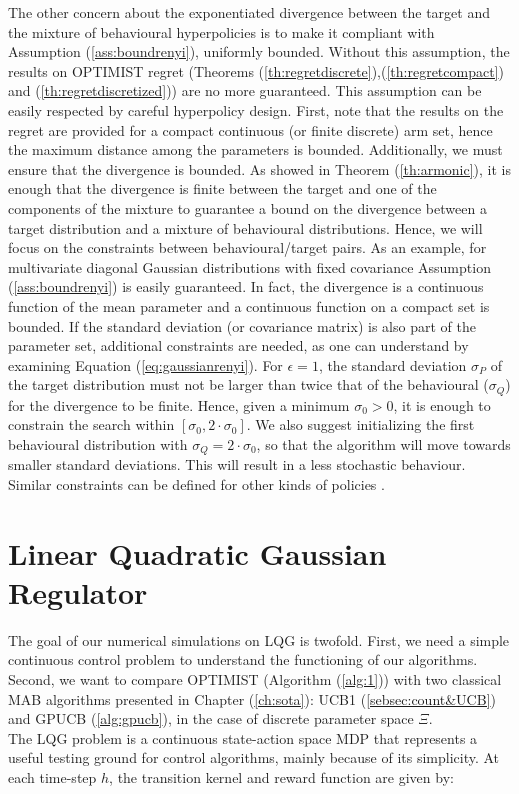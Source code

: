 The other concern about the exponentiated \Renyi divergence between the target and the mixture of behavioural hyperpolicies is to make it compliant with Assumption (\ref{ass:boundrenyi}), \ie uniformly bounded. Without this assumption, the results on \gls{OPTIMIST} regret (Theorems (\ref{th:regretdiscrete}),(\ref{th:regretcompact}) and (\ref{th:regretdiscretized})) are no more guaranteed. This assumption can be easily respected by careful hyperpolicy design. First, note that the results on the regret are provided for a compact continuous (or finite discrete) arm set, hence the maximum distance among the parameters is bounded. Additionally, we must ensure that the \Renyi divergence is bounded. As showed in Theorem (\ref{th:armonic}), it is enough that the divergence is finite between the target and one of the components of the mixture to guarantee a bound on the divergence between a target distribution and a mixture of behavioural distributions. Hence, we will focus on the constraints between behavioural/target pairs. As an example, for multivariate diagonal Gaussian distributions with fixed covariance Assumption (\ref{ass:boundrenyi}) is easily guaranteed. In fact, the \Renyi divergence is a continuous function of the mean parameter \cite{gil2013renyi} and a continuous function on a compact set is bounded. If the standard deviation (or covariance matrix) is also part of the parameter set, additional constraints are needed, as one can understand by examining Equation (\ref{eq:gaussianrenyi}). For $\epsilon=1$, the standard deviation $\sigma_P$ of the target distribution must not be larger than twice that of the behavioural ($\sigma_Q$) for the divergence to be finite. Hence, given a minimum $\sigma_{0} > 0$, it is enough to constrain the search within $[\sigma_0, 2\cdot\sigma_0]$. We also suggest initializing the first behavioural distribution with $\sigma_Q=2\cdot\sigma_0$, so that the algorithm will move towards smaller standard deviations. This will result in a less stochastic behaviour. Similar constraints can be defined for other kinds of policies \cite{gil2013renyi}. 


\section{Linear Quadratic Gaussian Regulator}
The goal of our numerical simulations on \gls{LQG} is twofold. First, we need a simple continuous control problem to understand the functioning of our algorithms. Second, we want to compare \gls{OPTIMIST} (Algorithm (\ref{alg:1})) with two classical \gls{MAB} algorithms presented in Chapter (\ref{ch:sota}): \gls{UCB}1 (\ref{sebsec:count&UCB}) and \gls{GPUCB} (\ref{alg:gpucb}), in the case of discrete parameter space $\Xi$.\\
The \gls{LQG} problem \cite{peters2008reinforcement} is a continuous state-action space \gls{MDP} that represents a useful testing ground for control algorithms, mainly because of its simplicity. At each time-step $h$, the transition kernel and reward function are given by:

